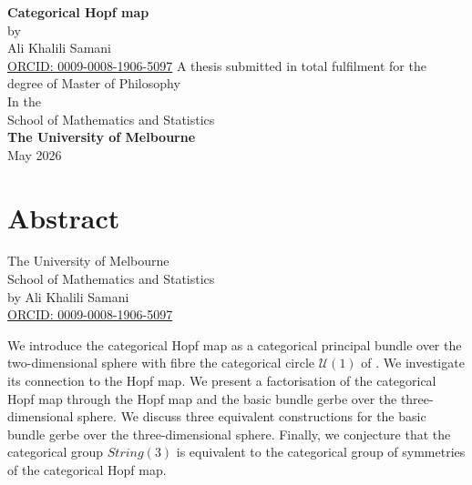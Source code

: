 \documentclass{article}
\theoremstyle{plain}
\theoremstyle{definition}
\begin{document}
\baselineskip=0.7cm

\begin{titlepage}
\begin{center}
\vspace*{1cm}
{\Huge
\textbf{Categorical Hopf map}}
\\[1.5cm]
{\Large by \\ Ali Khalili Samani \\
\href{https://orcid.org/0009-0008-1906-5097}{ORCID: 0009-0008-1906-5097}}
\vfill
{\Large A thesis submitted in total fulfilment for the \\
degree of Master of Philosophy}
\\[1cm]
{\Large In the \\
School of Mathematics and Statistics \\
\textbf{The University of Melbourne}}
\\[1cm]
{\Large May 2026}
\end{center}
\end{titlepage}


\newpage
{}
%
\section*{\centering Abstract}
\begin{center}
{\Large The University of Melbourne \\
School of Mathematics and Statistics \\[1cm]
by Ali Khalili Samani \\
\href{https://orcid.org/0009-0008-1906-5097}{ORCID: 0009-0008-1906-5097}} \\[1.5cm]
\end{center}
We introduce the categorical Hopf map as a categorical principal bundle over the two-dimensional sphere with fibre the categorical circle $\mathcal{U}(1)$ of \cite{MR3764535}. We investigate its connection to the Hopf map. We present a factorisation of the categorical Hopf map through the Hopf map and the basic bundle gerbe over the three-dimensional sphere. We discuss three equivalent constructions for the basic bundle gerbe over the three-dimensional sphere. Finally, we conjecture that the categorical group $String(3)$ is equivalent to the categorical group of symmetries of the categorical Hopf map.

\newpage
%
\end{document}
